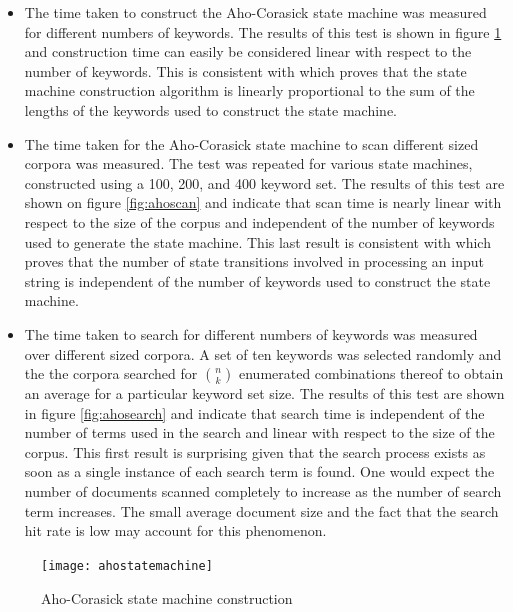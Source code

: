 \documentclass[10pt]{report}
\begin{document}
\begin{itemize}
\item The time taken to construct the Aho-Corasick state machine was
  measured for different numbers of keywords. The results of this test
  is shown in figure \ref{fig:ahostatemachine} and construction time
  can easily be considered linear with respect to the number of
  keywords. This is consistent with \cite{RefWorks:103} which proves
  that the state machine construction algorithm is linearly
  proportional to the sum of the lengths of the keywords used to
  construct the state machine.

\item The time taken for the Aho-Corasick state machine to scan
  different sized corpora was measured. The test was repeated for
  various state machines, constructed using a 100, 200, and 400
  keyword set. The results of this test are shown on figure
  \ref{fig:ahoscan} and indicate that scan time is nearly linear with
  respect to the size of the corpus and independent of the number of
  keywords used to generate the state machine. This last result is
  consistent with \cite{RefWorks:103} which proves that the number of
  state transitions involved in processing an input string is
  independent of the number of keywords used to construct the state
  machine.

\item The time taken to search for different numbers of keywords was
  measured over different sized corpora. A set of ten keywords was
  selected randomly and the the corpora searched for ${n \choose k}$
  enumerated combinations thereof to obtain an average for a
  particular keyword set size. The results of this test are shown in
  figure \ref{fig:ahosearch} and indicate that search time is
  independent of the number of terms used in the search and linear
  with respect to the size of the corpus. This first result is
  surprising given that the search process exists as soon as a single
  instance of each search term is found. One would expect the number
  of documents scanned completely to increase as the number of search
  term increases. The small average document size and the fact that
  the search hit rate is low may account for this phenomenon.
\end{itemize}


\begin{figure}
  \begin{center}
	\texttt{[image: ahostatemachine]}
  \end{center}
  \caption{Aho-Corasick state machine construction}
  \label{fig:ahostatemachine}
\end{figure} 
\end{document}
